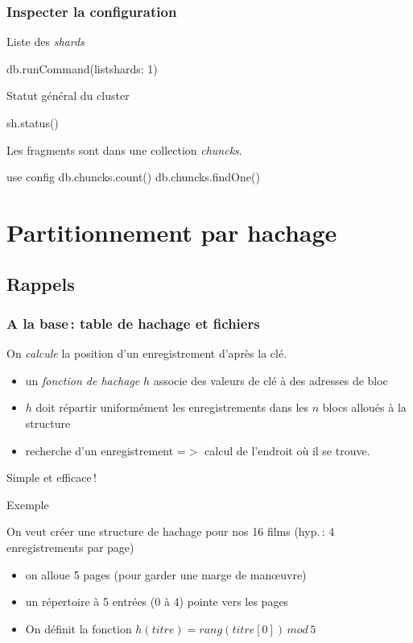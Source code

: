 \begin{frame}[fragile]
\frametitle{Inspecter la configuration}

Liste des \textit{shards}
\begin{smallverbatim}
db.runCommand({listshards: 1})
\end{smallverbatim}

Statut général du cluster
\begin{smallverbatim}
sh.status()
\end{smallverbatim}

Les fragments sont dans une collection \textit{chuncks}.

\begin{smallverbatim}
use config
db.chuncks.count()
db.chuncks.findOne()
\end{smallverbatim}
\end{frame}

\section{Partitionnement par hachage}

\subsection{Rappels}


\begin{frame}
\frametitle{A la base\,: table de hachage et fichiers}

On \textit{calcule} la position d'un enregistrement
d'après la clé.
\begin{itemize}
  \item un \textit{fonction de hachage} $h$ associe des
         valeurs de clé à des adresses de bloc
   \item $h$ doit répartir uniformément les enregistrements
            dans les $n$ blocs alloués à la structure
  \item recherche d'un enregistrement =$>$ calcul de l'endroit
          où il se trouve.
\end{itemize}
Simple et efficace\,!
\end{frame}


\begin{frame}{Exemple}

On veut créer une structure de hachage pour nos 16 films
(hyp.\,: 4 enregistrements   par page)
\begin{itemize}
  \item on alloue 5 pages (pour garder une marge de man{\oe}uvre)
  \item un répertoire à 5 entrées (0 à 4) pointe vers les pages
   \item On définit la fonction $h(titre) = rang(titre[0])\, mod\, 5$
\end{itemize}

\end{frame}

